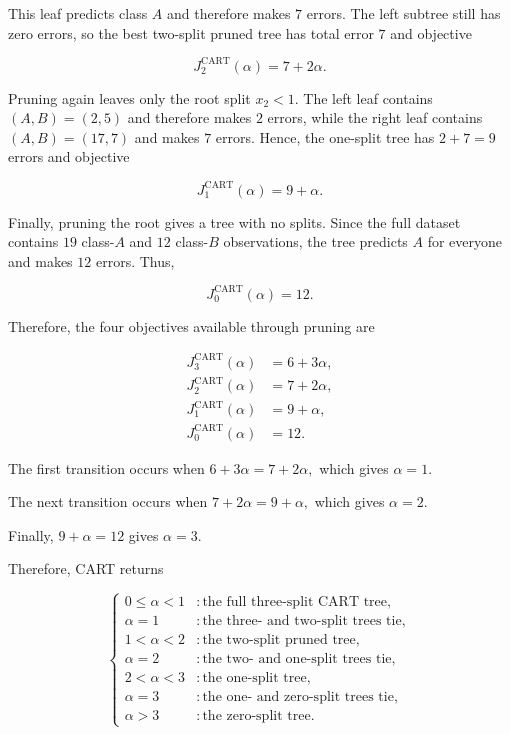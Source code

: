 \documentclass{article}
\begin{document}
This leaf predicts class $A$ and therefore makes $7$ errors. The left subtree still has zero errors, so the best two-split pruned tree has total error $7$ and objective

$$
J_2^{\mathrm{CART}}(\alpha)=7+2\alpha.
$$

Pruning again leaves only the root split $x_2<1$. The left leaf contains $(A,B)=(2,5)$ and therefore makes $2$ errors, while the right leaf contains $(A,B)=(17,7)$ and makes $7$ errors. Hence, the one-split tree has $
2+7=9
$ errors and objective

$$
J_1^{\mathrm{CART}}(\alpha)=9+\alpha.
$$

Finally, pruning the root gives a tree with no splits. Since the full dataset contains $19$ class-$A$ and $12$ class-$B$ observations, the tree predicts $A$ for everyone and makes $12$ errors. Thus,

$$
J_0^{\mathrm{CART}}(\alpha)=12.
$$

Therefore, the four objectives available through pruning are

$$
\begin{aligned}
J_3^{\mathrm{CART}}(\alpha)&=6+3\alpha,\\
J_2^{\mathrm{CART}}(\alpha)&=7+2\alpha,\\
J_1^{\mathrm{CART}}(\alpha)&=9+\alpha,\\
J_0^{\mathrm{CART}}(\alpha)&=12.
\end{aligned}
$$

The first transition occurs when $
6+3\alpha=7+2\alpha,
$ which gives $
\alpha=1.
$

The next transition occurs when $
7+2\alpha=9+\alpha,
$ which gives $
\alpha=2.
$

Finally, $
9+\alpha=12
$ gives $
\alpha=3.
$

Therefore, CART returns

$$
\begin{cases}
0\leq\alpha<1 &: \text{the full three-split CART tree},\\
\alpha=1 &: \text{the three- and two-split trees tie},\\
1<\alpha<2 &: \text{the two-split pruned tree},\\
\alpha=2 &: \text{the two- and one-split trees tie},\\
2<\alpha<3 &: \text{the one-split tree},\\
\alpha=3 &: \text{the one- and zero-split trees tie},\\
\alpha>3 &: \text{the zero-split tree}.
\end{cases}
$$
\end{document}
